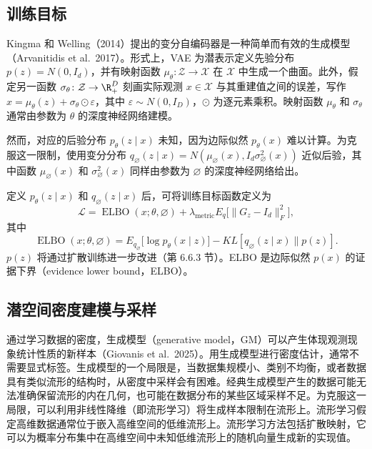 \subsection{训练目标}

Kingma 和 Welling（2014）提出的变分自编码器是一种简单而有效的生成模型（Arvanitidis et al.\ 2017）。形式上，VAE 为潜表示定义先验分布 $p(z)=N(0,I_d)$，并有映射函数 $\mu_\theta\colon\mathcal Z\to\mathcal X$ 在 $\mathcal X$ 中生成一个曲面。此外，假定另一函数 $\sigma_\theta\colon\mathcal Z\to\R_+^D$ 刻画实际观测 $x\in\mathcal X$ 与其重建值之间的误差，写作 $x=\mu_\theta(z)+\sigma_\theta\odot\varepsilon$，其中 $\varepsilon\sim N(0,I_D)$，$\odot$ 为逐元素乘积。映射函数 $\mu_\theta$ 和 $\sigma_\theta$ 通常由参数为 $\theta$ 的深度神经网络建模。

然而，对应的后验分布 $p_\theta(z\mid x)$ 未知，因为边际似然 $p_\theta(x)$ 难以计算。为克服这一限制，使用变分分布 $q_{\varnothing}(z\mid x)=N(\mu_{\varnothing}(x),I_d\sigma_{\varnothing}^2(x))$ 近似后验，其中函数 $\mu_{\varnothing}(x)$ 和 $\sigma_{\varnothing}^2(x)$ 同样由参数为 $\varnothing$ 的深度神经网络给出。

定义 $p_\theta(z\mid x)$ 和 $q_{\varnothing}(z\mid x)$ 后，可将训练目标函数定义为
\[
  \mathcal L=\operatorname{ELBO}(x;\theta,\varnothing)
  +\lambda_{\mathrm{metric}}E_q\bigl[\lVert G_z-I_d\rVert_F^2\bigr],
\]
其中
\[
  \operatorname{ELBO}(x;\theta,\varnothing)
   =E_{q_{\varnothing}}\bigl[\log p_\theta(x\mid z)\bigr]
      -KL[q_{\varnothing}(z\mid x)\mathbin{\|}p(z)].
\]
$p(z)$ 将通过扩散训练进一步改进（第 6.6.3 节）。ELBO 是边际似然 $p(x)$ 的证据下界（evidence lower bound，ELBO）。

\subsection{潜空间密度建模与采样}

通过学习数据的密度，生成模型（generative model，GM）可以产生体现观测现象统计性质的新样本（Giovanis et al.\ 2025）。用生成模型进行密度估计，通常不需要显式标签。生成模型的一个局限是，当数据集规模小、类别不均衡，或者数据具有类似流形的结构时，从密度中采样会有困难。经典生成模型产生的数据可能无法准确保留流形的内在几何，也可能在数据分布的某些区域采样不足。为克服这一局限，可以利用非线性降维（即流形学习）将生成样本限制在流形上。流形学习假定高维数据通常位于嵌入高维空间的低维流形上。流形学习方法包括扩散映射，它可以为概率分布集中在高维空间中未知低维流形上的随机向量生成新的实现值。

